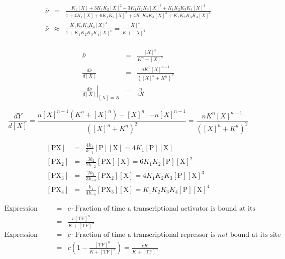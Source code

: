 \documentclass{article}
\begin{document}
\begin{eqnarray}
\bar{\nu} & = & \frac{K_1 \left[ X \right] + 3K_1K_2 \left[ X \right]^2 + 3K_1K_2K_3 \left[ X \right]^3 + K_1K_2K_3K_4 \left[ X \right]^4}{1 + 4K_1 \left[ X \right] + 6K_1K_2 \left[ X \right]^2 + 4K_1K_2K_3 \left[ X \right]^3 + K_1K_2K_3K_4 \left[ X \right]^4 \label{adair}}\\
\bar{\nu} & \approx & \frac{ K_1K_2K_3K_4 \left[ X \right]^4}{1 + K_1K_2K_3K_4 \left[ X \right]^4} =  \frac{ \left[ X \right]^4}{K +  \left[ X \right]^4} \label{hill}\\
\end{eqnarray}

\begin{eqnarray*}
\bar{\nu} & = &  \frac{ \left[ X \right]^n}{K^n +  \left[ X \right]^n}\\
\frac{d \bar{\nu}}{d\left[ X \right]} & = & \frac{nK^n \left[X \right]^{n-1}}{\left(\left[X\right]^n + K^n\right)^2} \\
\left. \frac{d \bar{\nu}}{d\left[ X \right]} \right|_{[X] = K} & = &   \frac{n}{4K}
\end{eqnarray*}

\[ \frac{dY}{d\left[X\right]} = \frac{n[X]^{n-1}\left(K^n + [X]^n\right) - [X]^n \cdot -n [X]^{n-1}}{\left([X]^n + K^n\right)^2} = \frac{nK^n [X]^{n-1}}{\left([X]^n + K^n\right)^2} \]


\begin{eqnarray*}
\left[ \textrm{PX} \right] & = & \frac{4k_1}{k_{-1}} \left[ \textrm{P} \right]\left[ \textrm{X} \right] = 4K_1 \left[ \textrm{P} \right]\left[ \textrm{X} \right]\\
\left[ \textrm{PX}_2 \right] & = &  \frac{3k_2}{2k_{-2}} \left[ \textrm{PX} \right]\left[ \textrm{X} \right] =  6K_1K_2 \left[ \textrm{P} \right]\left[ \textrm{X} \right]^2\\
\left[ \textrm{PX}_3 \right] & = &  \frac{2k_3}{3k_{-3}} \left[ \textrm{PX}_2 \right]\left[ \textrm{X} \right] = 4K_1K_2K_3 \left[ \textrm{P} \right]\left[ \textrm{X} \right]^3\\
\left[ \textrm{PX}_4 \right] & = &  \frac{k_4}{4k_{-4}} \left[ \textrm{PX}_3 \right]\left[ \textrm{X} \right]  = K_1K_2K_3K_4 \left[ \textrm{P} \right]\left[ \textrm{X} \right]^4
\end{eqnarray*}


\begin{eqnarray*}
\textrm{Expression rate } & = &  c \cdot \textrm{Fraction of time a transcriptional activator is bound at its site}\\
& = & \frac{c \left[ \textrm{TF} \right]^n}{K + \left[ \textrm{TF} \right]^n}\\
\textrm{Expression rate } & = &  c \cdot \textrm{Fraction of time a transcriptional repressor is }\textit{not}\textrm{ bound at its site}\\
& = & c \left(1 - \frac{\left[ \textrm{TF} \right]^n}{K + \left[ \textrm{TF} \right]^n} \right) = \frac{c K}{K + \left[ \textrm{TF} \right]^n}
\end{eqnarray*}
\end{document}
